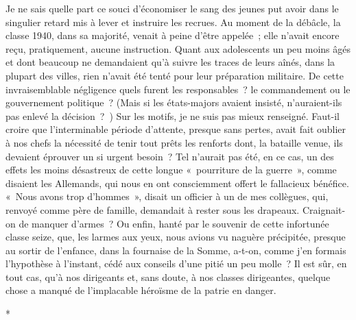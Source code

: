 \documentclass[french,twoside]{book} %
\begin{document}
Je ne sais quelle part ce souci d’économiser le sang des jeunes put avoir dans le singulier retard mis à lever et instruire les recrues. Au moment de la débâcle, la classe 1940, dans sa majorité, venait à peine d’être appelée ; elle n’avait encore reçu, pratiquement, aucune instruction. Quant aux adolescents un peu moins âgés et dont beaucoup ne demandaient qu’à suivre les traces de leurs aînés, dans la plupart des villes, rien n’avait été tenté pour leur préparation militaire. De cette invraisemblable négligence quels furent les responsables ? le   commandement ou le gouvernement politique ? (Mais si les états-majors avaient insisté, n’auraient-ils pas enlevé la décision ? ) Sur les motifs, je ne suis pas mieux renseigné. Faut-il croire que l’interminable période d’attente, presque sans pertes, avait fait oublier à nos chefs la nécessité de tenir tout prêts les renforts dont, la bataille venue, ils devaient éprouver un si urgent besoin ? Tel n’aurait pas été, en ce cas, un des effets les moins désastreux de cette longue « pourriture de la guerre », comme disaient les Allemands, qui nous en ont consciemment offert le fallacieux bénéfice. « Nous avons trop d’hommes », disait un officier à un de mes collègues, qui, renvoyé comme père de famille, demandait à rester sous les drapeaux. Craignait-on de manquer d’armes ? Ou enfin, hanté par le souvenir de cette infortunée classe seize, que, les larmes aux yeux, nous avions vu naguère précipitée, presque au sortir de l’enfance, dans la fournaise de la Somme, a-t-on, comme j’en formais l’hypothèse à l’instant, cédé aux conseils d’une pitié un peu molle ? Il est sûr, en tout cas, qu’à nos dirigeants et, sans doute, à nos classes dirigeantes, quelque chose a manqué de l’implacable héroïsme de la patrie en danger.\par

\begin{center}
\noindent \centerline{*}\par
\end{center}
\end{document}
